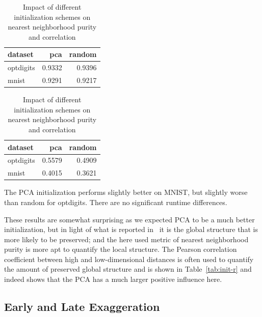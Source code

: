 \begin{table}[tb]
  \begin{subtable}{\linewidth}
    \centering
    \begin{tabular}{lrr}
      \toprule
  dataset & pca & random\\ \midrule
  optdigits & \num{0.9332} & \num{0.9396} \\
  mnist & \num{0.9291} & \num{0.9217} \\
      \bottomrule
    \end{tabular}
    \caption{Nearest neighborhood purity}
    \label{tab:init-knn}
  \end{subtable}
  \par\bigskip
  \begin{subtable}{\linewidth}
    \centering
    \begin{tabular}{lrr}
      \toprule
      dataset & pca & random\\ \midrule
      optdigits & \num{0.5579} & \num{0.4909} \\
      mnist & \num{0.4015} & \num{0.3621} \\
      \bottomrule
    \end{tabular}
    \caption{Average Pearson correlation coefficient between high and low-dimensional distances}
    \label{tab:init-r}
  \end{subtable}
  \caption{Impact of different initialization schemes on nearest neighborhood purity and correlation}
  \label{tab:init}
\end{table}

The PCA initialization performs slightly better on MNIST, but slightly worse
than random for optdigits. There are no significant runtime differences.

These results are somewhat surprising as we expected PCA to be a much better
initialization, but in light of what is reported in~\cite{umap_rebuttal} it is
the global structure that is more likely to be preserved; and the here used
metric of nearest neighborhood purity is more apt to quantify the local
structure. The Pearson correlation coefficient between high and low-dimensional
distances is often used to quantify the amount of preserved global structure
and is shown in Table~\ref{tab:init-r} and indeed shows that the PCA has a much
larger positive influence here.

\subsection{Early and Late Exaggeration}

